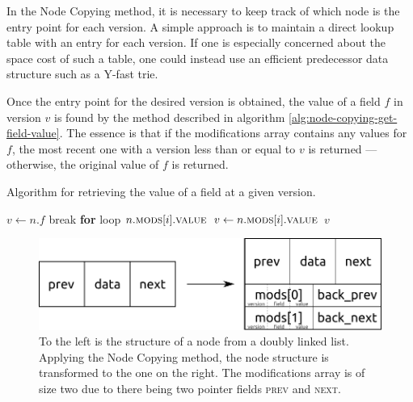 In the Node Copying method, it is necessary to keep track of which node is the
entry point for each version. A simple approach is to maintain a direct lookup
table with an entry for each version. If one is especially concerned about the
space cost of such a table, one could instead use an efficient predecessor data
structure such as a Y-fast trie.

Once the entry point for the desired version is obtained, the value of a field
$f$ in version $v$ is found by the method described in algorithm
\ref{alg:node-copying-get-field-value}. The essence is that if the modifications
array contains any values for $f$, the most recent one with a version less than
or equal to $v$ is returned --- otherwise, the original value of $f$ is
returned.

\begin{algorithm}[!ht]
  \caption{Algorithm for retrieving the value of a field at a given version.}
  \label{alg:node-copying-get-field-value}
  \begin{algorithmic}[1]
      \State $v \gets n.f$
          \State break \textbf{for} loop
            \State \Return $n.\textsc{mods}[i].\textsc{value}$
          \Else
            \State $v \gets n.\textsc{mods}[i].\textsc{value}$
          \EndIf
        \EndIf
      \EndFor
      \State \Return $v$
    \EndFunction
  \end{algorithmic}
\end{algorithm}

\begin{figure}[!ht]
  \includegraphics[width=.9\textwidth]{figures/node-copying-example.pdf}

  \caption{To the left is the structure of a node from a doubly linked list.
  Applying the Node Copying method, the node structure is transformed to the one
  on the right. The modifications array is of size two due to there being two
  pointer fields \textsc{prev} and \textsc{next}.}

  \label{fig:node-copying-example}
\end{figure}

